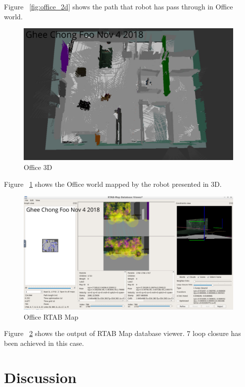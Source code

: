 \documentclass[10pt,journal,compsoc]{IEEEtran}
\begin{document}
Figure ~\ref{fig:office_2d} shows the path that robot has pass through in Office world.

\begin{figure}[thpb]
      \centering
      \includegraphics[width=\linewidth]{Office_3D.png}
      \caption{Office 3D}
      \label{fig:office_3d}
\end{figure}

Figure ~\ref{fig:office_3d} shows the Office world mapped by the robot presented in 3D.

\begin{figure}[thpb]
      \centering
      \includegraphics[width=\linewidth]{Office_RTAB_Map.png}
      \caption{Office RTAB Map}
      \label{fig:office_rtabmap}
\end{figure}

Figure ~\ref{fig:office_rtabmap} shows the output of RTAB Map database viewer.  7 loop closure has been achieved in this case.

\section{Discussion}
 
\end{document}
